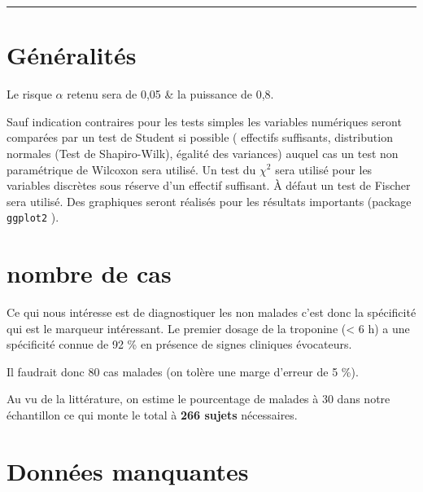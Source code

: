 \documentclass[
  a4paperpaper,
  french,
  oneside,
  open=any]{scrreprt}
\renewcommand*\contentsname{Table des matières}
\newcommand\contentsname{Table des matières}
\begin{document}

\renewcommand*\contentsname{Table des matières}
{
\hypersetup{linkcolor=}
\setcounter{tocdepth}{2}
\tableofcontents
}
\begin{center}\rule{0.5\linewidth}{0.5pt}\end{center}

\hypertarget{guxe9nuxe9ralituxe9s}{%
\chapter{Généralités}\label{guxe9nuxe9ralituxe9s}}

Le risque \(\alpha\) retenu sera de 0,05 \& la puissance de 0,8.

Sauf indication contraires pour les tests simples les variables
numériques seront comparées par un test de Student si possible (
effectifs suffisants, distribution normales (Test de Shapiro-Wilk),
égalité des variances) auquel cas un test non paramétrique de Wilcoxon
sera utilisé. Un test du \(\chi^2\) sera utilisé pour les variables
discrètes sous réserve d'un effectif suffisant. À défaut un test de
Fischer sera utilisé. Des graphiques seront réalisés pour les résultats
importants (package \texttt{ggplot2} \autocite{ggplot}).

\hypertarget{nombre-de-cas}{%
\chapter{nombre de cas}\label{nombre-de-cas}}

Ce qui nous intéresse est de diagnostiquer les non malades c'est donc la
spécificité qui est le marqueur intéressant. Le premier dosage de la
troponine (\textless{} 6 h) a une spécificité connue de 92 \% en
présence de signes cliniques évocateurs.

Il faudrait donc 80 cas malades (on tolère une marge d'erreur de 5 \%).

Au vu de la littérature, on estime le pourcentage de malades à 30 dans
notre échantillon ce qui monte le total à \textbf{266 sujets}
nécessaires.

\hypertarget{donnuxe9es-manquantes}{%
\chapter{Données manquantes}\label{donnuxe9es-manquantes}}
\end{document}
